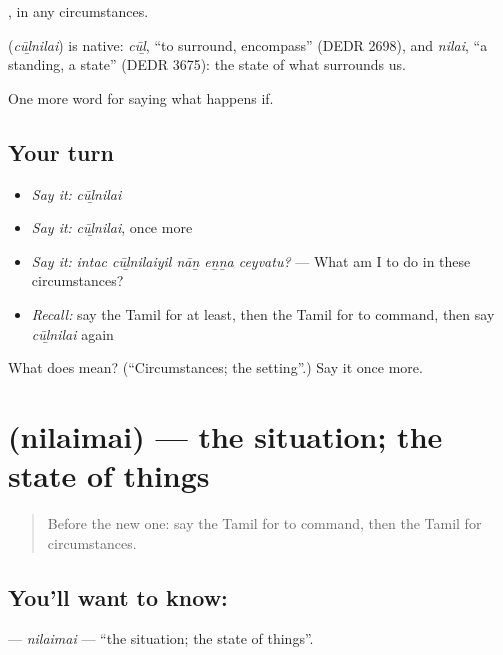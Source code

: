  , in any circumstances.

\begin{cousinweb}
\textbf{} (\emph{cūḻnilai}) is native: \emph{cūḻ}, \textquotedblleft{}to surround, encompass\textquotedblright{} (DEDR 2698), and \emph{nilai}, \textquotedblleft{}a standing, a state\textquotedblright{} (DEDR 3675): the state of what surrounds us.
\end{cousinweb}

\begin{grammarlens}[title={What you've built}]
One more word for saying what happens if.
\end{grammarlens}

\subsection*{Your turn}
\begin{itemize}
\raggedright
  \item \emph{Say it:} \emph{cūḻnilai}
  \item \emph{Say it:} \emph{cūḻnilai}, once more
  \item \emph{Say it:} \emph{intac cūḻnilaiyil nāṉ eṉṉa ceyvatu?} — What am I to do in these circumstances?
  \item \emph{Recall:} say the Tamil for at least, then the Tamil for to command, then say \emph{cūḻnilai} again
\end{itemize}

\begin{tcolorbox}[breakable,colback=teal!4,colframe=teal!35!black,title={Before you move on}]
What does  mean? (\textquotedblleft{}Circumstances; the setting\textquotedblright{}.) Say it once more.
\end{tcolorbox}
\section[\texorpdfstring{\ta{நிலைமை} (nilaimai)}{நிலைமை (nilaimai)}]{ (nilaimai) — the situation; the state of things}

\label{lesson:TA-C385-nilaimai}



\begin{quote}
Before the new one: say the Tamil for to command, then the Tamil for circumstances.
\end{quote}

\subsection*{You'll want to know: }
\textbf{} — \emph{nilaimai} — \textquotedblleft{}the situation; the state of things\textquotedblright{}.


